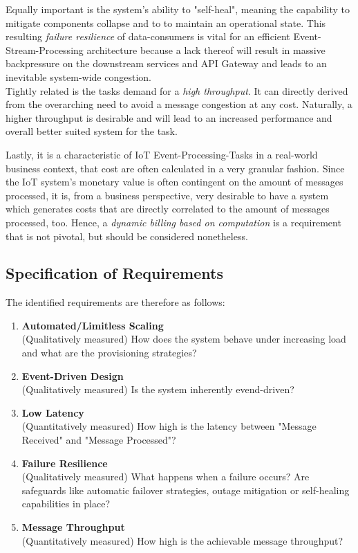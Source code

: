 Equally important is the system's ability to "self-heal", meaning the capability to mitigate components collapse and to to maintain an operational state. This resulting \textit{failure resilience} of data-consumers is vital for an efficient Event-Stream-Processing architecture because a lack thereof will result in massive backpressure on the downstream services and API Gateway and leads to an inevitable system-wide congestion.\\
Tightly related is the tasks demand for a \textit{high throughput}. It can directly derived from the overarching need to avoid a message congestion at any cost. Naturally, a higher throughput is desirable and will lead to an increased performance and overall better suited system for the task.

Lastly, it is a characteristic of IoT Event-Processing-Tasks in a real-world business context, that cost are often calculated in a very granular fashion. Since the IoT system's monetary value is often contingent on the amount of messages processed, it is, from a business perspective, very desirable to have a system which generates costs that are directly correlated to the amount of messages processed, too. Hence, a \textit{dynamic billing based on computation} is a requirement that is not pivotal, but should be considered nonetheless.

\subsection{Specification of Requirements}

The identified requirements are therefore as follows:

\begin{enumerate}
    \item \textbf{Automated/Limitless Scaling}\\
        (Qualitatively measured) How does the system behave under increasing load and what are the provisioning strategies?
    \item \textbf{Event-Driven Design}\\
        (Qualitatively measured) Is the system inherently evend-driven?
    \item \textbf{Low Latency}\\
        (Quantitatively measured) How high is the latency between "Message Received" and "Message Processed"?
    \item \textbf{Failure Resilience}\\
        (Qualitatively measured) What happens when a failure occurs? Are safeguards like automatic failover strategies, outage mitigation or self-healing capabilities in place?
    \item \textbf{Message Throughput}\\
        (Quantitatively measured) How high is the achievable message throughput?
\end{enumerate}




